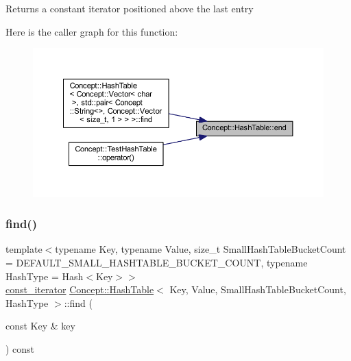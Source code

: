 \begin{DoxyReturn}{Returns}
a constant iterator positioned above the last entry 
\end{DoxyReturn}
Here is the caller graph for this function\+:\nopagebreak
\begin{figure}[H]
\begin{center}
\leavevmode
\includegraphics[width=350pt]{class_concept_1_1_hash_table_a4621e02c1fedb16e29a88ae0b517ffd2_icgraph}
\end{center}
\end{figure}
\mbox{\label{class_concept_1_1_hash_table_acaa2106cab7de32f3a6467b023d04773}} 
\subsubsection{\texorpdfstring{find()}{find()}}
{\footnotesize\ttfamily template$<$typename Key, typename Value, size\+\_\+t Small\+Hash\+Table\+Bucket\+Count = D\+E\+F\+A\+U\+L\+T\+\_\+\+S\+M\+A\+L\+L\+\_\+\+H\+A\+S\+H\+T\+A\+B\+L\+E\+\_\+\+B\+U\+C\+K\+E\+T\+\_\+\+C\+O\+U\+NT, typename Hash\+Type = Hash$<$\+Key$>$$>$ \\
\mbox{\hyperlink{class_concept_1_1_hash_table_a567c99ad671a5065563483689abdf399}{const\+\_\+iterator}} \mbox{\hyperlink{class_concept_1_1_hash_table}{Concept\+::\+Hash\+Table}}$<$ Key, Value, Small\+Hash\+Table\+Bucket\+Count, Hash\+Type $>$\+::find (\begin{DoxyParamCaption}\item[{const Key \&}]{key }\end{DoxyParamCaption}) const\hspace{0.3cm}{\ttfamily [inline]}}


